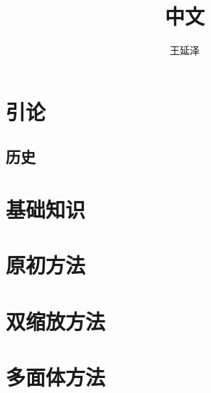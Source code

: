 \documentclass[UTF8]{article}
\title{中文}
\author{王延泽}
\begin{document}
\maketitle
\section{引论}
\subsection{历史}

\section{基础知识}
\section{原初方法}
\section{双缩放方法}
\section{多面体方法}
\end{document}
